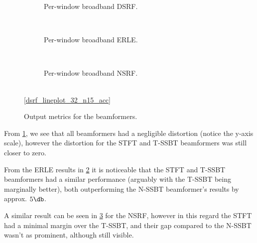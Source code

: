 
\begin{figure}[H]
\begin{subfigure}{\textwidth}
	\centering
	
	\caption{Per-window broadband DSRF.}
	\label{subfig:lineplot_dsrf_32_n15_acc}
\end{subfigure}\\[1em]
\begin{subfigure}{\textwidth}
	\centering
	
	\caption{Per-window broadband ERLE.}
	\label{subfig:lineplot_erle_32_n15_acc}
\end{subfigure}\\[1em]
\begin{subfigure}{\textwidth}
	\centering
	
	\caption{Per-window broadband NSRF.}
	\label{subfig:lineplot_nsrf_32_n15_acc}
\end{subfigure}\\[1em]
\centering\ref*{dsrf_lineplot_32_n15_acc}
\caption{Output metrics for the beamformers.}
\label{fig:lineplots_32_n15_acc}
\end{figure}

From \cref{subfig:lineplot_dsrf_32_n15_acc}, we see that all beamformers had a negligible distortion (notice the y-axis scale), however the distortion for the STFT and T-SSBT beamformers was still closer to zero.

From the ERLE results in \cref{subfig:lineplot_erle_32_n15_acc} it is noticeable that the STFT and T-SSBT beamformers had a similar performance (arguably with the T-SSBT being marginally better), both outperforming the N-SSBT beamformer's results by approx. $5\dB$.

A similar result can be seen in \cref{subfig:lineplot_nsrf_32_n15_acc} for the NSRF, however in this regard the STFT had a minimal margin over the T-SSBT, and their gap compared to the N-SSBT wasn't as prominent, although still visible.